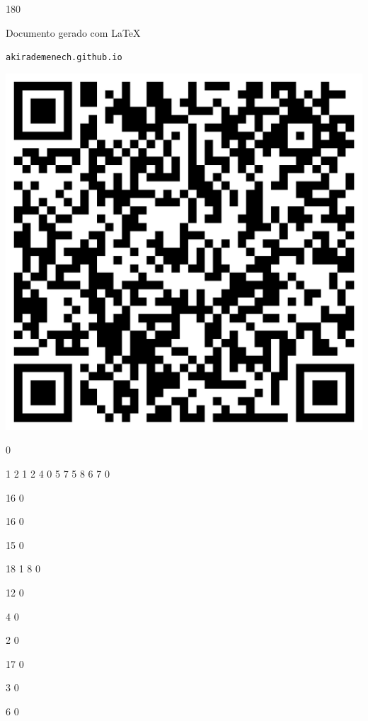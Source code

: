 \documentclass[12pt]{article}
\begin{document}
	\begin{turn}{180}	
		\begin{minipage}{\textwidth}		  
		  Documento gerado com \LaTeX			
		  
		  \texttt{akirademenech.github.io}

		  \includegraphics[height=0.3\textheight]{2e-2.pdf}

		\end{minipage}	
	\end{turn}  
		  
		\vfill  
		  
{
	0	%

	1	%
	2	%
	1	%
	2	%
	4	%
	0	%
	5	%
	7	%
	5	%
	8	%
	6	%
	7	%
	0	%

	16	%
	0	%

	16	%
	0	%

	15	%
	0	%

	18	%
	1	%
	8	%
	0	%

	12	%
	0	%

	4	%
	0	%

	2	%
	0	%

	17	%
	0	%

	3	%
	0	%

	6	%
	0	%

}	  
		    	
\end{document}
